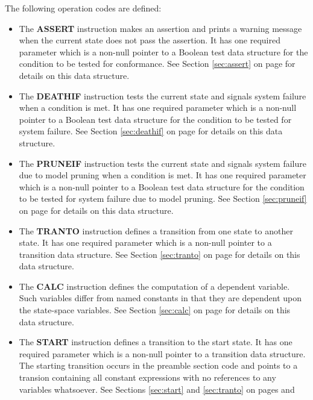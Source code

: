 The following operation codes are defined:
\begin{itemize}
\item The {\bf ASSERT} instruction makes an assertion and prints a warning
      message when the current state does not pass the assertion.   It has
      one required parameter which is a non-null pointer to a Boolean test
      data structure for the condition to be tested for conformance.
      See Section \ref{sec:assert} on page \pageref{sec:assert}
      for details on this data structure.
\item The {\bf DEATHIF} instruction tests the current state and signals
      system failure when a condition is met.  It has
      one required parameter which is a non-null pointer to a Boolean test
      data structure for the condition to be tested for system failure.
      See Section \ref{sec:deathif} on page \pageref{sec:deathif}
      for details on this data structure.
\item The {\bf PRUNEIF} instruction tests the current state and signals
      system failure due to model pruning when a condition is met.  It has
      one required parameter which is a non-null pointer to a Boolean test
      data structure for the condition to be tested for system failure due
      to model pruning.
      See Section \ref{sec:pruneif} on page \pageref{sec:pruneif}
      for details on this data structure.
\item The {\bf TRANTO} instruction defines a transition from one state to
      another state.  It has
      one required parameter which is a non-null pointer to a transition
      data structure.
      See Section \ref{sec:tranto} on page \pageref{sec:tranto}
      for details on this data structure.
\item The {\bf CALC} instruction defines the computation of a dependent
      variable.   Such variables differ from named constants in that they
      are dependent upon the state-space variables.
      See Section \ref{sec:calc} on page \pageref{sec:calc}
      for details on this data structure.
\item The {\bf START} instruction defines a transition to the start state.
      It has
      one required parameter which is a non-null pointer to a transition
      data structure.
      The starting transition occurs in the preamble section code and
      points to a transion containing all constant expressions with no
      references to any variables whatsoever.
      See Sections \ref{sec:start} and  \ref{sec:tranto}
      on pages \pageref{sec:start} and \pageref{sec:tranto}

\end{itemize}
